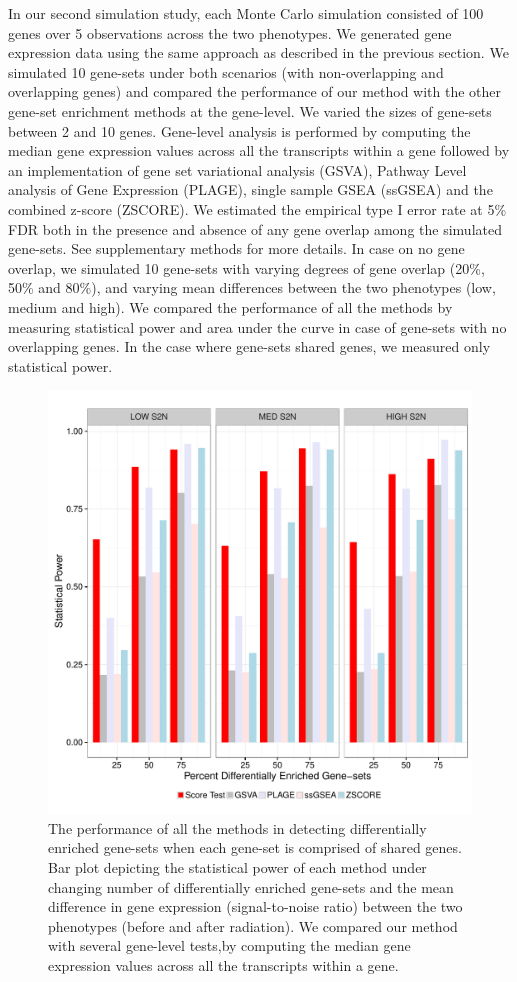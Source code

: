 \documentclass[hidelinks,11pt]{article}
\begin{document}
In our second simulation study, each Monte Carlo simulation consisted of 100 genes over 5 observations across the two phenotypes. We generated gene expression data using the same approach as described in the previous section. We simulated 10 gene-sets under both scenarios (with non-overlapping and overlapping genes) and compared the performance of our method with the other gene-set enrichment methods at the gene-level. We varied the sizes of gene-sets between 2 and 10 genes. Gene-level analysis is performed by computing the median gene expression values across all the transcripts within a gene followed by an implementation of gene set variational analysis (GSVA), Pathway Level analysis of Gene Expression (PLAGE), single sample GSEA (ssGSEA) and the combined z-score (ZSCORE). We estimated the empirical type I error rate at 5\% FDR both in the presence and absence of any gene overlap among the simulated gene-sets. See supplementary methods for more details. In case on no gene overlap, we simulated 10 gene-sets with varying degrees of gene overlap (20\%, 50\% and 80\%), and varying mean differences between the two phenotypes (low, medium and high). We compared the performance of all the methods by measuring statistical power and area under the curve in case of gene-sets with no overlapping genes. In the case where gene-sets shared genes, we measured only statistical power. 

\begin{figure}[!ht]
\centering
\includegraphics[width=\textwidth]{Figure3.pdf}
\caption{The performance of all the methods in detecting differentially enriched gene-sets when each gene-set is comprised of shared genes. Bar plot depicting the statistical power of each method under changing number of differentially enriched gene-sets and the mean difference in gene expression (signal-to-noise ratio) between the two phenotypes (before and after radiation). We compared our method with several gene-level tests,by computing the median gene expression values across all the transcripts within a gene.}
\end{figure}
\end{document}
